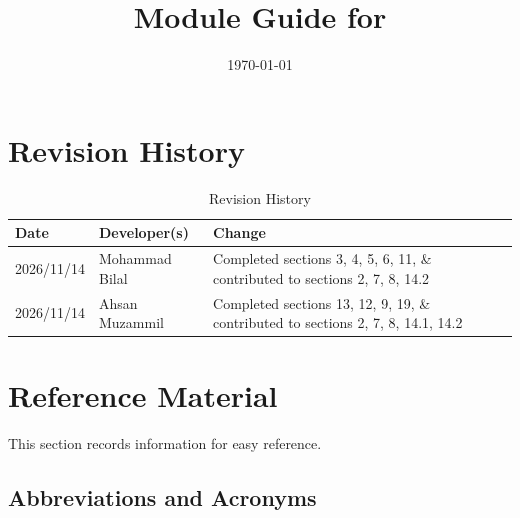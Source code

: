 \documentclass[10pt, titlepage]{article}
\begin{document}
\title{Module Guide for \progname{}} 
\author{\authname}
\date{\today}

\maketitle


\section{Revision History}

\begin{table}[!htbp]
\caption{Revision History} \label{TblRevisionHistory}
\begin{tabularx}{\textwidth}{llX}
\toprule
\textbf{Date} & \textbf{Developer(s)} & \textbf{Change}\\
\midrule
2026/11/14 & Mohammad Bilal & Completed sections 3, 4, 5, 6, 11, \& contributed to sections 2, 7, 8, 14.2 \\
2026/11/14 & Ahsan Muzammil & Completed sections 13, 12, 9, 19, \& contributed to sections 2, 7, 8, 14.1, 14.2 \\
\bottomrule
\end{tabularx}
\end{table}

\newpage

\tableofcontents

\newpage

\listoftables

\listoffigures

\newpage


\section{Reference Material}

This section records information for easy reference. 

\subsection{Abbreviations and Acronyms} \label{SecAcronyms}
\end{document}
